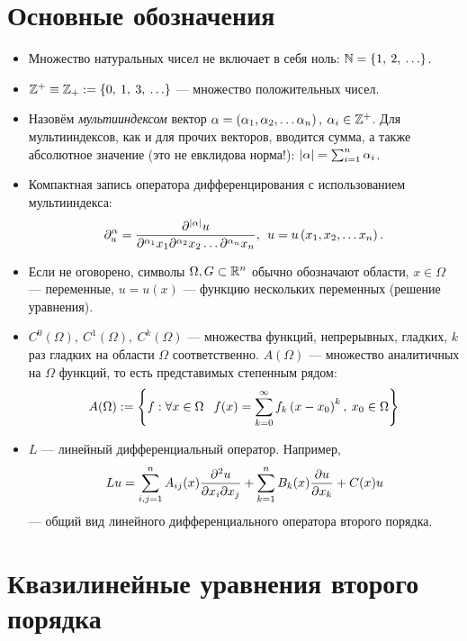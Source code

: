 \newpage
\section{Основные обозначения}
\begin{itemize}
    \item Множество натуральных чисел не включает в себя ноль: $ \mathbb{N} = \left\{{1,\:2,\:\ldots}\right\} $.
    \item $\mathbb{Z}^+ \equiv \mathbb{Z}_+ := \left\{{0,\:1,\:3,\:\ldots}\right\}$ --- множество положительных чисел.
    \item Назовём \textit{мультииндексом} вектор $\alpha = \left({\alpha_1,\alpha_2, \ldots\alpha_n}\right),\: \alpha_i \in \mathbb{Z}^+ $.
          Для мультииндексов, как и для прочих векторов, вводится сумма, а также абсолютное значение (это не евклидова норма!):
          $\left|{\alpha}\right| = \sum_{i = 1}^n \alpha_i$.
    \item Компактная запись оператора дифференцирования с использованием мультииндекса:
          \[
              \partial^{\alpha}_u = \frac{\partial^{\left|{\alpha}\right|}u}
              {\partial^{\alpha_1}x_1 \partial^{\alpha_2}x_2 \ldots \partial^{\alpha_n}x_n},\:\:
              u = u\left({x_1, x_2, \dots x_n}\right).
          \]
    \item Если не оговорено, символы $\Omega, G \subset \mathbb{R}^n$ обычно обозначают области, $x \in \Omega$ --- переменные,
          $u = u(x)$ --- функцию нескольких переменных (решение уравнения).
    \item $C^0(\Omega),\: C^1(\Omega),\: C^k(\Omega)$\: --- множества функций, непрерывных, гладких, $k$ раз гладких на
          области $\Omega$ соответственно. $A(\Omega)$ --- множество аналитичных на $\Omega$ функций, то есть представимых
          степенным рядом:
          \[
              A(\Omega) := \braces{f : \forall x \in \Omega \:\ \: f(x) = \sum_{k = 0}^{\infty} f_k \brackets{x - x_0}^k,\: x_0 \in \Omega}
          \]
    \item $L$ --- линейный дифференциальный оператор. Например,
          \[
              Lu = \sum_{i,j = 1}^n A_{ij}(x) \frac{\partial^2u}{\partial x_i\partial x_j} + \sum_{k = 1}^n B_k(x)\frac{\partial u}{\partial x_k} + C(x)u
          \]
          --- общий вид линейного дифференциального оператора второго порядка.
\end{itemize}

\newpage
\section{Квазилинейные уравнения второго порядка}
